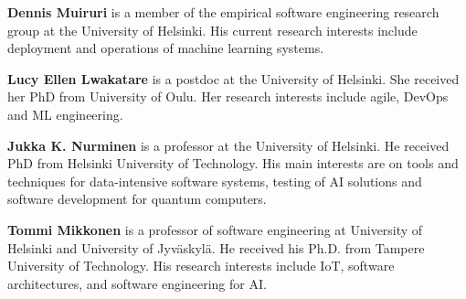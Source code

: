 \textbf{Dennis Muiruri} is a member of the empirical software engineering research group at the University of Helsinki. His current research interests include deployment and operations of machine learning systems.

\textbf{Lucy Ellen Lwakatare} is a postdoc at the University of Helsinki. She received her PhD from University of Oulu.
Her research interests include agile, DevOps and ML engineering.

\textbf{Jukka K. Nurminen} is a professor at the University of Helsinki. 
He received PhD from Helsinki University of Technology. His main interests are on tools and techniques for data-intensive software systems, testing of AI solutions and software development for quantum computers.

\textbf{Tommi Mikkonen} is a professor of software engineering at University of Helsinki and University of Jyv\"{a}skyl\"{a}. He received his Ph.D. from Tampere University of Technology. His research interests include IoT, software architectures, and software engineering for AI.
